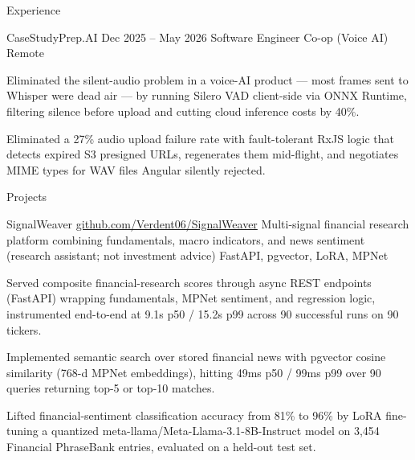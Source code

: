\documentclass[
	11pt
]{../../../template}
\begin{document}
\begin{rSection}{E}{xperience}
		\begin{rSectionEntry}
			{CaseStudyPrep.AI}
			{Dec 2025 -- May 2026}
			{Software Engineer Co-op (Voice AI)}
			{}
			{Remote}

			\item Eliminated the silent-audio problem in a voice-AI product --- most frames sent to Whisper were dead air --- by running Silero VAD client-side via ONNX Runtime, filtering silence before upload and cutting cloud inference costs by 40\%.
			\item Eliminated a 27\% audio upload failure rate with fault-tolerant RxJS logic that detects expired S3 presigned URLs, regenerates them mid-flight, and negotiates MIME types for WAV files Angular silently rejected.
		\end{rSectionEntry}
	\end{rSection}

	\begin{rSection}{P}{rojects}
		\begin{rSectionEntry}
			{SignalWeaver}
			{\href{https://github.com/Verdent06/SignalWeaver}{github.com/Verdent06/SignalWeaver}}
			{Multi-signal financial research platform combining fundamentals, macro indicators, and news sentiment (research assistant; not investment advice)}
			{FastAPI, pgvector, LoRA, MPNet}
			{}

			\item Served composite financial-research scores through async REST endpoints (FastAPI) wrapping fundamentals, MPNet sentiment, and regression logic, instrumented end-to-end at 9.1s p50 / 15.2s p99 across 90 successful runs on 90 tickers.
			\item Implemented semantic search over stored financial news with pgvector cosine similarity (768-d MPNet embeddings), hitting 49ms p50 / 99ms p99 over 90 queries returning top-5 or top-10 matches.
			\item Lifted financial-sentiment classification accuracy from 81\% to 96\% by LoRA fine-tuning a quantized meta-llama/Meta-Llama-3.1-8B-Instruct model on 3,454 Financial PhraseBank entries, evaluated on a held-out test set.
		\end{rSectionEntry}

	\end{rSection}
\end{document}
